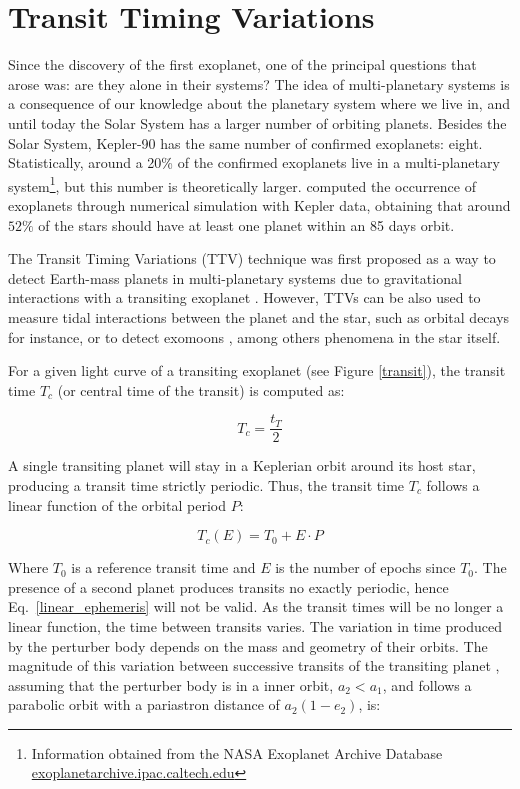 \section{Transit Timing Variations\label{ttv}}

Since the discovery of the first exoplanet, one of the principal questions that arose was: are they alone in their systems? The idea of multi-planetary systems is a consequence of our knowledge about the planetary system where we live in, and until today the Solar System has a larger number of orbiting planets. Besides the Solar System, Kepler-90 has the same number of confirmed exoplanets: eight. Statistically, around a 20\% of the confirmed exoplanets live in a multi-planetary system\footnote{Information obtained from the NASA Exoplanet Archive Database \url{exoplanetarchive.ipac.caltech.edu}}, but this number is theoretically larger. \cite{Fressin2013} computed the occurrence of exoplanets through numerical simulation with Kepler data, obtaining that around $52\%$ of the stars should have at least one planet within an 85 days orbit.

The Transit Timing Variations (TTV) technique was first proposed as a way to detect Earth-mass planets in multi-planetary systems due to gravitational interactions with a transiting exoplanet \citep{Holman2005,Agol2005}. However, TTVs can be also used to measure tidal interactions between the planet and the star, such as orbital decays for instance, or to detect exomoons \citep{Kipping2009a,Kipping2009b}, among others phenomena in the star itself. 

For a given light curve of a transiting exoplanet (see Figure \ref{transit}), the transit time $T_{c}$ (or central time of the transit) is computed as:

\begin{equation}
T_{c} = \frac{t_T}{2}
\end{equation}

A single transiting planet will stay in a Keplerian orbit around its host star, producing a transit time strictly periodic. Thus, the transit time $T_c$ follows a linear function of the orbital period $P$: 

\begin{equation}
T_{c}(E) = T_{0} + E \cdot P
\label{linear_ephemeris} 
\end{equation}

Where $T_0$ is a reference transit time and $E$ is the number of epochs since $T_0$.  The presence of a second planet produces transits no exactly periodic, hence Eq.~\ref{linear_ephemeris} will not be valid. As the transit times will be no longer a linear function,  the time between transits varies.  The variation in time produced by the perturber body depends on the mass and geometry of their orbits. The magnitude of this variation between successive transits of the transiting planet \citep{Holman2005}, assuming that the perturber body is in a inner orbit, $a_2 < a_1$, and follows a parabolic orbit with a pariastron distance of $a_2(1-e_2)$, is:

